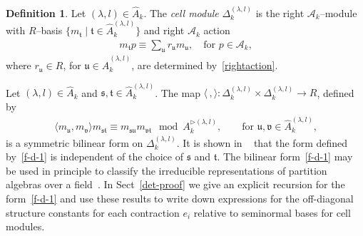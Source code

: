 \documentclass[11pt,a4paper,reqno,svgnames]{amsart}
\theoremstyle{plain}
\theoremstyle{definition}
\newtheorem{definition}[theorem]{Definition}
\numberwithin{equation}{section}
\begin{document}
\begin{definition}\label{cellmodule}
Let $(\lambda,l)\in\hat{A}_k$. The \emph{cell module} $\Delta^{(\lambda,l)}_{k}$ is the right $\mathcal{A}_k$--module  with $R$--basis $\lbrace m_\mathfrak{t}\mid\mathfrak{t}\in\hat{A}_k^{(\lambda,l)}\rbrace$ and right $\mathcal{A}_k$ action
\begin{align*}
m_\mathfrak{t}p\equiv \sum_{\mathfrak{u}}r_\mathfrak{u}m_\mathfrak{u}, \quad\text{for $p\in\mathcal{A}_k$,}
\end{align*}
where $r_\mathfrak{u}\in R$, for $\mathfrak{u}\in\hat{A}_k^{(\lambda,l)}$, are determined by~\eqref{rightaction}. 
\end{definition}
 Let $(\lambda,l)\in\hat{A}_k$ and $\mathfrak{s,t}\in\hat{A}_k^{(\lambda,l)}$. The map $\langle\,,\rangle:\Delta^{(\lambda,l)}_{k}\times \Delta^{(\lambda,{l})}_{k}\to R$, defined by 
\begin{align}\label{f-d-1}
\langle m_\mathfrak{u}, m_\mathfrak{v}\rangle
m_\mathfrak{st}\equiv 
m_\mathfrak{su} m_\mathfrak{vt} \mod A_{k}^{\rhd(\lambda,l)},\qquad\text{for $\mathfrak{u},\mathfrak{v}\in\hat{A}_{k}^{(\lambda,l)}$,}
\end{align}
is a symmetric bilinear form on $\Delta^{(\lambda,l)}_{k}$. It is shown in ~\cite[Sect.~2]{MR1376244} that the form defined by~\eqref{f-d-1} is independent of the choice of $\mathfrak{s}$ and $\mathfrak{t}$. 
The bilinear form~\eqref{f-d-1} may be used in principle to classify the irreducible representations of partition algebras over a field~\cite[Theorem~(3.4)]{MR1376244}. In Sect~\ref{det-proof} we give an explicit recursion for the form~\eqref{f-d-1} and use these results to write down expressions for the off-diagonal structure constants for each contraction $e_i$ relative to seminormal bases for cell modules. 
\end{document}
